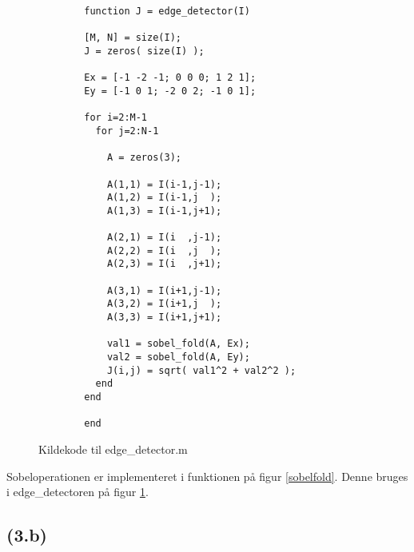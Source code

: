 \documentclass{article}
\begin{document}
\begin{figure}
	\begin{verbatim}
		function J = edge_detector(I)

		[M, N] = size(I);
		J = zeros( size(I) );

		Ex = [-1 -2 -1; 0 0 0; 1 2 1];
		Ey = [-1 0 1; -2 0 2; -1 0 1];

		for i=2:M-1
		  for j=2:N-1

		    A = zeros(3);

		    A(1,1) = I(i-1,j-1);
		    A(1,2) = I(i-1,j  );
		    A(1,3) = I(i-1,j+1);

		    A(2,1) = I(i  ,j-1);
		    A(2,2) = I(i  ,j  );
		    A(2,3) = I(i  ,j+1);

		    A(3,1) = I(i+1,j-1);
		    A(3,2) = I(i+1,j  );
		    A(3,3) = I(i+1,j+1);

		    val1 = sobel_fold(A, Ex);
		    val2 = sobel_fold(A, Ey);
		    J(i,j) = sqrt( val1^2 + val2^2 );
		  end
		end

		end
	\end{verbatim}
	\caption{Kildekode til edge\_detector.m}
	\label{edgedetector}
\end{figure}

Sobeloperationen er implementeret i funktionen på figur \ref{sobelfold}.
Denne bruges i edge\_detectoren på figur \ref{edgedetector}.

\subsection*{(3.b)}
\end{document}
